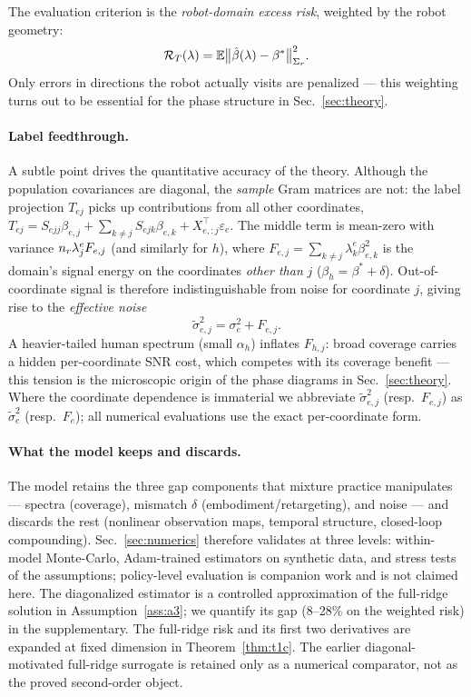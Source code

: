 The evaluation criterion is the \emph{robot-domain excess risk}, weighted by the robot geometry:
\begin{equation}
  \mathcal{R}_T(\lambda) = \mathbb{E}\big\| \hat\beta(\lambda) - \beta^* \big\|^2_{\Sigma_r}.
  \label{eq:risk}
\end{equation}
Only errors in directions the robot actually visits are penalized --- this weighting turns out to be essential for the phase structure in Sec.~\ref{sec:theory}.

\paragraph{Label feedthrough.}
A subtle point drives the quantitative accuracy of the theory.
Although the population covariances are diagonal, the \emph{sample} Gram matrices are not: the label projection $T_{ej}$ picks up contributions from all other coordinates, $T_{ej} = S_{ejj}\beta_{e,j} + \sum_{k\neq j} S_{ejk}\beta_{e,k} + X_{e,:j}^\top\varepsilon_e$.
The middle term is mean-zero with variance $n_r\lambda^e_j F_{e,j}$ (and similarly for $h$), where $F_{e,j} = \sum_{k\neq j} \lambda^e_k\beta_{e,k}^2$ is the domain's signal energy on the coordinates \emph{other than} $j$ ($\beta_h = \beta^* + \delta$).
Out-of-coordinate signal is therefore indistinguishable from noise for coordinate $j$, giving rise to the \emph{effective noise}
\begin{equation}
  \tilde\sigma_{e,j}^2 = \sigma_e^2 + F_{e,j} .
  \label{eq:feedthrough}
\end{equation}
A heavier-tailed human spectrum (small $\alpha_h$) inflates $F_{h,j}$: broad coverage carries a hidden per-coordinate SNR cost, which competes with its coverage benefit --- this tension is the microscopic origin of the phase diagrams in Sec.~\ref{sec:theory}.
Where the coordinate dependence is immaterial we abbreviate $\tilde\sigma_{e,j}^2$ (resp.\ $F_{e,j}$) as $\tilde\sigma_e^2$ (resp.\ $F_e$); all numerical evaluations use the exact per-coordinate form.

\paragraph{What the model keeps and discards.}
The model retains the three gap components that mixture practice manipulates --- spectra (coverage), mismatch $\delta$ (embodiment/retargeting), and noise --- and discards the rest (nonlinear observation maps, temporal structure, closed-loop compounding).
Sec.~\ref{sec:numerics} therefore validates at three levels: within-model Monte-Carlo, Adam-trained estimators on synthetic data, and stress tests of the assumptions; policy-level evaluation is companion work and is not claimed here.
The diagonalized estimator is a controlled approximation of the full-ridge solution in Assumption~\ref{ass:a3}; we quantify its gap (8--28\% on the weighted risk) in the supplementary. The full-ridge risk and its first two derivatives are expanded at fixed dimension in Theorem~\ref{thm:t1c}. The earlier diagonal-motivated full-ridge surrogate is retained only as a numerical comparator, not as the proved second-order object.
